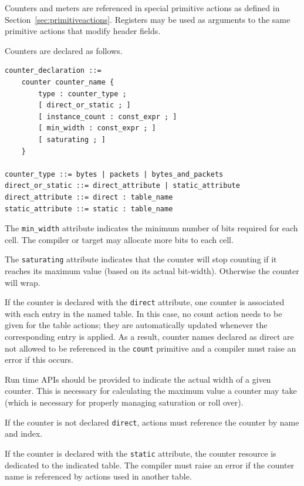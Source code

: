 \documentclass[12pt]{article}
\begin{document}
Counters and meters are referenced in special primitive actions as defined 
in Section~\ref{sec:primitiveactions}. Registers may be used as arguments to 
the same primitive actions that modify header fields.


Counters are declared as follows.

\begin{lstlisting}[style=BNFstyle]
counter_declaration ::=
    counter counter_name { 
        type : counter_type ;
        [ direct_or_static ; ]
        [ instance_count : const_expr ; ]
        [ min_width : const_expr ; ]
        [ saturating ; ]
    }

counter_type ::= bytes | packets | bytes_and_packets
direct_or_static ::= direct_attribute | static_attribute
direct_attribute ::= direct : table_name
static_attribute ::= static : table_name
\end{lstlisting}


The \texttt{min_width} attribute indicates the minimum number of bits
required for each cell.  The compiler or target may allocate more bits
to each cell.

The \texttt{saturating} attribute indicates that the counter will stop
counting if it reaches its maximum value (based on its actual
bit-width). Otherwise the counter will wrap.

If the counter is declared with the \texttt{direct} attribute, one
counter is associated with each entry in the named table. In this
case, no count action needs to be given for the table actions; they
are automatically updated whenever the corresponding entry is
applied. As a result, counter names declared as direct are not allowed
to be referenced in the \texttt{count} primitive and a compiler must
raise an error if this occurs.

Run time APIs should be provided to indicate the actual width of a
given counter.  This is necessary for calculating the maximum value a
counter may take (which is necessary for properly managing saturation
or roll over).

If the counter is not declared \texttt{direct}, actions must reference
the counter by name and index.

If the counter is declared with the \texttt{static} attribute, the
counter resource is dedicated to the indicated table. The compiler
must raise an error if the counter name is referenced by actions used
in another table.
\end{document}
